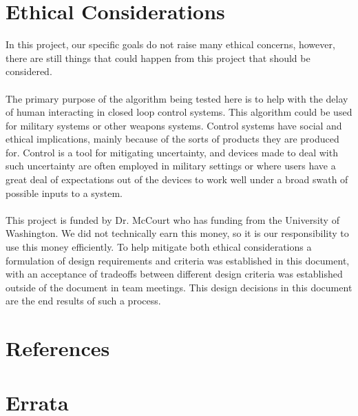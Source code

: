 \documentclass[english,12pt]{article}
\begin{document}
\section{Ethical Considerations}
In this project, our specific goals do not raise many ethical concerns, however, there are still things that
could happen from this project that should be considered.\\\\
The primary purpose of the algorithm being tested here is to help with the delay of
human interacting in closed loop control systems. This algorithm could be used for military systems or
other weapons systems. Control systems have social and ethical implications, mainly 
because of the sorts of products they are produced for. Control is a tool for mitigating 
uncertainty, and devices made to deal with such uncertainty are often employed in military settings 
or where users have a great deal of expectations out of the devices to work well under a broad swath 
of possible inputs to a system.\\\\
This project is funded by Dr. McCourt who has funding from the University of Washington. 
We did not technically earn this money, so it is our responsibility to use this money efficiently.
To help mitigate both ethical considerations a formulation of design requirements and criteria 
was established in this document, with an acceptance of tradeoffs between different design criteria 
was established outside of the document in team meetings. This design decisions in this document are 
the end results of such a process. 
\section{References}
\section{Errata}
\end{document}
